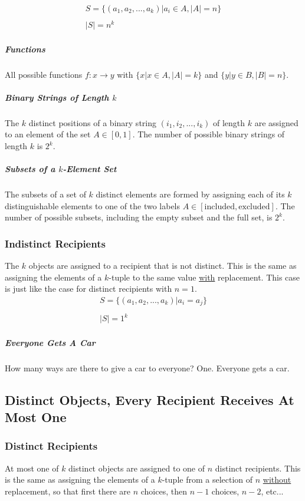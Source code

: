 \begin{equation}	
\begin{array}{l}
S = \{ (a_1,a_2,...,a_k) | a_i \in A, |A| = n \}\\
\\
|S| = n^k
\end{array}
\end{equation}

\subparagraph{Functions} All possible functions $f:x \rightarrow y$ with $\{x | x\in A, |A| = k \}$ and $\{y | y\in B, |B| = n\}$.

\subparagraph{Binary Strings of Length $k$} The $k$ distinct positions of a binary string $(i_1,i_2,...,i_k)$ of length $k$ are assigned to an element of the set $A\in[0,1]$. The number of possible binary strings of length $k$ is $2^k$.

\subparagraph{Subsets of a $k$-Element Set} The subsets of a set of $k$ distinct elements are formed by assigning each of its $k$ distinguishable elements to one of the two labels $A\in [\mathrm{included},\mathrm{excluded}]$. The number of possible subsets, including the empty subset and the full set, is $2^k$.

\subsubsection{Indistinct Recipients}
The $k$ objects are assigned to a recipient that is not distinct. This is the same as assigning the elements of a $k$-tuple to the same value \underline{with} replacement. This case is just like the case for distinct recipients with $n=1$.
\begin{equation}	
\begin{array}{l}
S = \{ (a_1,a_2,...,a_k) | a_i = a_j\}\\
\\
|S| = 1^k
\end{array}
\end{equation}

\subparagraph{Everyone Gets A Car} How many ways are there to give a car to everyone? One. Everyone gets a car.


\subsection{Distinct Objects, Every Recipient Receives At Most One}
\subsubsection{Distinct Recipients}
At most one of $k$ distinct objects are assigned to one of $n$ distinct recipients. This is the same as assigning the elements of a $k$-tuple from a selection of $n$ \underline{without} replacement, so that first there are $n$ choices, then $n-1$ choices, $n-2$, etc...

